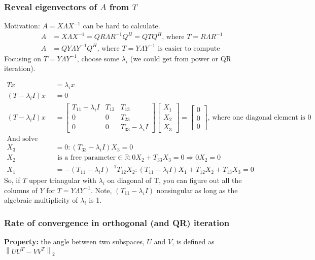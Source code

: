 \documentclass{article}
\newcommand{\norm}[2]{\left\lVert#1\right\rVert_#2}
\begin{document}
\subsubsection{Reveal eigenvectors of $A$ from $T$}
Motivation: $A = X\Lambda X^{-1}$ can be hard to calculate.
\begin{align*}
    A &= X\Lambda X^{-1} = QR \Lambda R^{-1}Q^H = QTQ^H \textrm{, where } T = R\Lambda R^{-1}\\
    A &= QY\Lambda Y^{-1}Q^H \textrm{, where $T = Y \Lambda Y^{-1}$ is easier to compute}
\end{align*}
Focusing on $T = Y \Lambda Y^{-1}$, choose some $\lambda_i$ (we could get from power or QR iteration). 

\begin{align*}
    Tx &= \lambda_i x\\
    (T - \lambda_i I)x &= 0\\
    (T - \lambda_i I)x  &= \begin{bmatrix} T_{11} - \lambda_i I & T_{12} & T_{13}\\ 0 & 0 & T_{23}\\
            0 & 0 & T_{33} - \lambda_i I \end{bmatrix} \begin{bmatrix} X_1 \\ X_2 \\ X_3 \end{bmatrix} = \begin{bmatrix} 0 \\ 0 \\ 0 \end{bmatrix} \textrm{, where one diagonal element is 0}\\
    \textrm{And solve with back substitution:}&\\
            X_3 &= 0: (T_{33} - \lambda_i I) X_3 = 0\\
            X_2 &\textrm{ is a free parameter} \in \mathbb{R}: 0X_2 + T_{33}X_3 = 0 \Longrightarrow 0X_2 = 0\\
            X_1 &= -(T_{11}-\lambda_i I)^{-1}T_{12}X_2: (T_{11}-\lambda_i I)X_1 + T_{12}X_2 + T_{13}X_3 = 0
\end{align*}
So, if $T$ upper triangular with $\lambda_i$ on diagonal of T, you can figure out all the columns of $Y$ for $T = Y\Lambda Y^{-1}$. Note, $(T_{11} - \lambda_i I)$ nonsingular as long as the algebraic multiplicity of $\lambda_i$ is 1.


\subsubsection{Rate of convergence in orthogonal (and QR) iteration}
\textbf{Property:} the angle between two subspaces, $U$ and $V$, is defined as $\norm{UU^T - VV^T}{2}$
\end{document}
